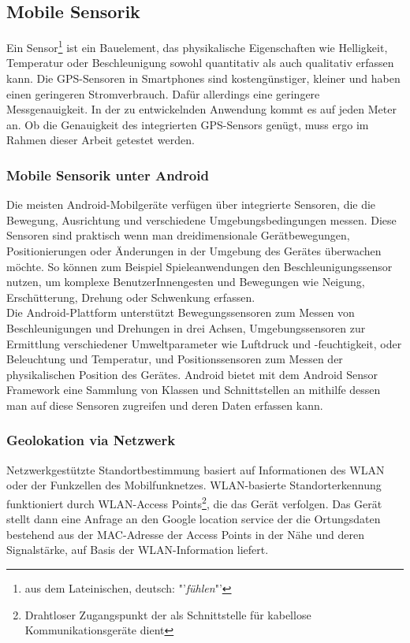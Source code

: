 \subsection{Mobile Sensorik} 
Ein Sensor\footnote{ aus dem Lateinischen, deutsch: "'\textit{fühlen}"'} ist ein Bauelement, das physikalische Eigenschaften wie Helligkeit, Temperatur oder Beschleunigung sowohl quantitativ als auch qualitativ erfassen kann. Die \gls{GPS}-Sensoren in \glspl{Smartphone} sind kostengünstiger, kleiner und haben einen geringeren Stromverbrauch. Dafür allerdings eine geringere Messgenauigkeit. In der zu entwickelnden Anwendung kommt es auf jeden Meter an. Ob die Genauigkeit des integrierten \gls{GPS}-Sensors genügt, muss ergo im Rahmen dieser Arbeit getestet werden. 
\subsubsection{Mobile Sensorik unter Android}
Die meisten Android-Mobilgeräte verfügen über integrierte Sensoren, die die Bewegung, Ausrichtung und verschiedene Umgebungsbedingungen messen. Diese Sensoren sind praktisch wenn man dreidimensionale Gerätbewegungen, Positionierungen oder Änderungen in der Umgebung des Gerätes überwachen möchte. So können zum Beispiel Spieleanwendungen den Beschleunigungssensor nutzen, um komplexe BenutzerInnengesten und Bewegungen wie Neigung, Erschütterung, Drehung oder Schwenkung erfassen.\\
Die Android-Plattform unterstützt Bewegungssensoren zum Messen von Beschleunigungen und Drehungen in drei Achsen, Umgebungssensoren zur Ermittlung verschiedener Umweltparameter wie Luftdruck und -feuchtigkeit, oder Beleuchtung und Temperatur, und Positionssensoren zum Messen der physikalischen Position des Gerätes. Android bietet mit dem Android Sensor Framework eine Sammlung von Klassen und Schnittstellen an mithilfe dessen man auf diese Sensoren zugreifen und deren Daten erfassen kann. \cite{android_sensor}  
\subsubsection{Geolokation via Netzwerk}
Netzwerkgestützte Standortbestimmung basiert auf Informationen des \gls{WLAN} oder der Funkzellen des Mobilfunknetzes. \gls{WLAN}-basierte Standorterkennung funktioniert durch \gls{WLAN}-Access Points\footnote{ Drahtloser Zugangspunkt der als Schnittstelle für kabellose Kommunikationsgeräte dient}, die das Gerät verfolgen. Das Gerät stellt dann eine Anfrage an den Google location service der die Ortungsdaten bestehend aus der MAC-Adresse der Access Points in der Nähe und deren Signalstärke, auf Basis der \gls{WLAN}-Information liefert. \\

